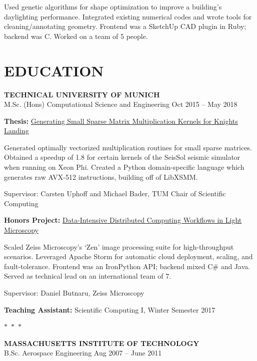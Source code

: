 \documentclass[margin]{res}
\begin{document}
\begin{resume}
		Used genetic algorithms for shape optimization to improve a building's daylighting performance. Integrated existing numerical codes and wrote tools for cleaning/annotating geometry. Frontend was a SketchUp CAD plugin in Ruby; backend was C. Worked on a team of 5 people.

	\section{EDUCATION}%
		\textbf{TECHNICAL UNIVERSITY OF MUNICH} \\
		M.Sc. (Hons) Computational Science and Engineering%
		\hfill Oct 2015 -- May 2018
		
		\textbf{Thesis:} \underline{Generating Small Sparse Matrix Multiplication Kernels for Knights Landing}

			Generated optimally vectorized multiplication routines for small sparse matrices. Obtained a speedup of 1.8 for certain kernels of the SeisSol seismic simulator when running on Xeon Phi. Created a Python domain-specific language which generates raw AVX-512 instructions, building off of LibXSMM. 

			Supervisor: Carsten Uphoff and Michael Bader, TUM Chair of Scientific Computing

		\textbf{Honors Project:} \underline{Data-Intensive Distributed Computing Workflows in Light Microscopy}

			Scaled Zeiss Microscopy's `Zen' image processing suite for high-throughput scenarios. Leveraged Apache Storm for automatic cloud deployment, scaling, and fault-tolerance. Frontend was an IronPython API; backend mixed C\# and Java. Served as technical lead on an international team of 7. 

			Supervisor: Daniel Butnaru, Zeiss Microscopy 


		\textbf{Teaching Assistant:} Scientific Computing I, Winter Semester 2017

\begin{center}
  $\ast$~$\ast$~$\ast$
\end{center}



		\textbf{MASSACHUSETTS INSTITUTE OF TECHNOLOGY} \\
		B.Sc. Aerospace Engineering%
		\hfill Aug 2007 -- June 2011


\end{resume}
\end{document}
